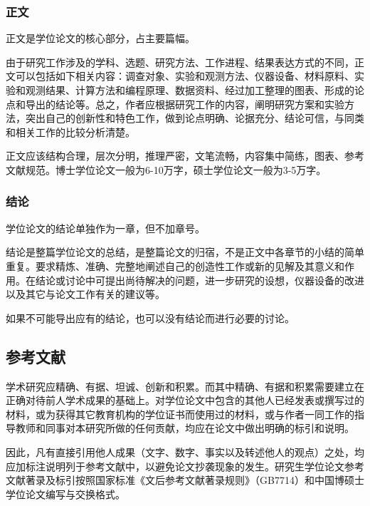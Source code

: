 \subsubsection{正文}
正文是学位论文的核心部分，占主要篇幅。

由于研究工作涉及的学科、选题、研究方法、工作进程、结果表达方式的不同，正文可以包括如下相关内容：调查对象、实验和观测方法、仪器设备、材料原料、实验和观测结果、计算方法和编程原理、数据资料、经过加工整理的图表、形成的论点和导出的结论等。总之，作者应根据研究工作的内容，阐明研究方案和实验方法，突出自己的创新性和特色工作，做到论点明确、论据充分、结论可信，与同类和相关工作的比较分析清楚。

正文应该结构合理，层次分明，推理严密，文笔流畅，内容集中简练，图表、参考文献规范。博士学位论文一般为6-10万字，硕士学位论文一般为3-5万字。

\subsubsection{结论}
学位论文的结论单独作为一章，但不加章号。

结论是整篇学位论文的总结，是整篇论文的归宿，不是正文中各章节的小结的简单重复。要求精炼、准确、完整地阐述自己的创造性工作或新的见解及其意义和作用。在结论或讨论中可提出尚待解决的问题，进一步研究的设想，仪器设备的改进以及其它与论文工作有关的建议等。

如果不可能导出应有的结论，也可以没有结论而进行必要的讨论。

\subsection{参考文献}
学术研究应精确、有据、坦诚、创新和积累。而其中精确、有据和积累需要建立在正确对待前人学术成果的基础上。对学位论文中包含的其他人已经发表或撰写过的材料，或为获得其它教育机构的学位证书而使用过的材料，或与作者一同工作的指导教师和同事对本研究所做的任何贡献，均应在论文中做出明确的标引和说明。

因此，凡有直接引用他人成果（文字、数字、事实以及转述他人的观点）之处，均应加标注说明列于参考文献中，以避免论文抄袭现象的发生。研究生学位论文参考文献著录及标引按照国家标准《文后参考文献著录规则》（GB7714）和中国博硕士学位论文编写与交换格式。

